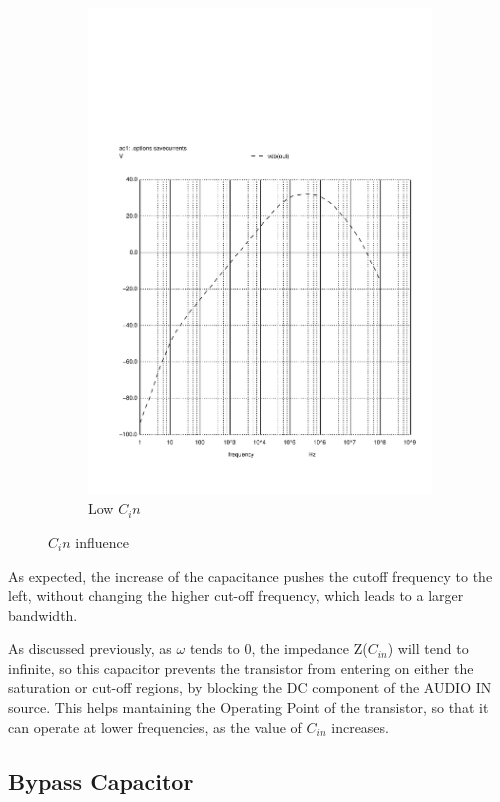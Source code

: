 \begin{figure}[H]
\begin{subfigure}{0.3\textwidth}
\includegraphics[width=\textwidth]{c1low.pdf}
\caption{Low $C_in$}
\label{lowcin}
\end{subfigure}
\caption{$C_in$ influence}
\end{figure}

As expected, the increase of the capacitance pushes the cutoff frequency to the left,
without changing the higher cut-off frequency, which leads to a larger bandwidth. \par
As discussed previously, as $\omega$ tends to 0, the impedance Z($C_{in}$) will tend to infinite, so this
capacitor prevents the transistor from entering on either the saturation or cut-off regions, by blocking the DC component of the AUDIO IN source. This helps mantaining the Operating Point of the transistor, so that it can operate at lower frequencies, as the value of $C_{in}$ increases.

\subsection{Bypass Capacitor}

